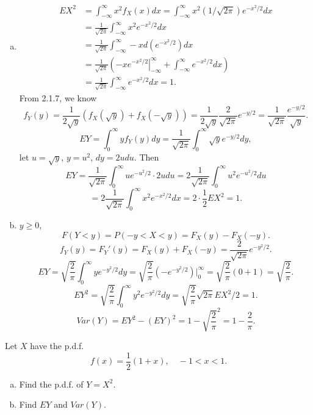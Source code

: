 \documentclass[14pt]{elegantbook}
\begin{document}
    \begin{solution}
        \begin{enumerate}[(a)]
            \item \begin{align*}
                EX^2&=\int_{-\infty}^\infty x^2f_X(x)dx=\int_{-\infty}^\infty x^2(1/\sqrt{2\pi})e^{-x^2/2}dx\\
                &=\frac{1}{\sqrt{2\pi}}\int_{-\infty}^\infty x^2e^{-x^2/2}dx\\
                &=\frac{1}{\sqrt{2\pi}}\int_{-\infty}^\infty-xd(e^{-x^2/2})dx\\
                &=\frac{1}{\sqrt{2\pi}}\left(\left.-xe^{-x^2/2}\right|_{-\infty}^\infty+\int_{-\infty}^\infty e^{-x^2/2}dx\right)\\
                &=\frac{1}{\sqrt{2\pi}}\int_{-\infty}^\infty e^{-x^2/2}dx=1. 
            \end{align*}
            From 2.1.7, we know 
            \[f_Y(y)=\frac{1}{2\sqrt{y}}(f_X(\sqrt{y})+f_X(-\sqrt{y}))=\frac{1}{2\sqrt{y}}\frac{2}{\sqrt{2\pi}}e^{-y/2}=\frac{1}{\sqrt{2\pi}}\frac{e^{-y/2}}{\sqrt{y}}. \]
            \[EY=\int_{0}^\infty yf_Y(y)dy=\frac{1}{\sqrt{2\pi}}\int_0^\infty \sqrt{y}e^{-y/2}dy, \]
            let $u=\sqrt{y}$, $y=u^2$, $dy=2udu$. Then 
            \[EY=\frac{1}{\sqrt{2\pi}}\int_0^\infty ue^{-u^2/2}\cdot 2u du=2\frac{1}{\sqrt{2\pi}}\int_0^\infty u^2e^{-u^2/2}du\]
            \[=2\frac{1}{\sqrt{2\pi}}\int_0^\infty x^2e^{-x^2/2}dx=2\cdot \frac{1}{2}EX^2=1. \]
            \item $y\geq0$, 
            \[F(Y<y)=P(-y<X<y)=F_X(y)-F_X(-y). \]
            \[f_Y(y)=F_Y'(y)=F_X(y)+F_X(-y)=\frac{2}{\sqrt{2\pi}}e^{-y^2/2}. \]
            \[EY=\sqrt{\frac{2}{\pi}}\int_0^\infty ye^{-y^2/2}dy=\sqrt{\frac{2}{\pi}}(-e^{-y^2/2})|_0^\infty=\sqrt{\frac{2}{\pi}}(0+1)=\sqrt{\frac{2}{\pi}}. \]
            \[
                EY^2=\sqrt{\frac{2}{\pi}}\int_{0}^\infty y^2e^{-y^2/2}dy=\sqrt{\frac{2}{\pi}}\sqrt{2\pi}EX^2/2=1. \]
            \[
                Var(Y)=EY^2-(EY)^2=1-\sqrt{\frac{2}{\pi}}^2=1-\frac{2}{\pi}. 
            \]
        \end{enumerate}
    \end{solution}

    \setcounter{exer}{22}
    \begin{exercise}
        Let $X$ have the p.d.f. 
        \[f(x)=\frac{1}{2}(1+x), \quad -1<x<1 .\]
        \begin{enumerate}[(a)]
            \item Find the p.d.f. of $Y=X^2$. 
            \item Find $EY$ and $Var(Y)$. 
        \end{enumerate}
    \end{exercise}
\end{document}
